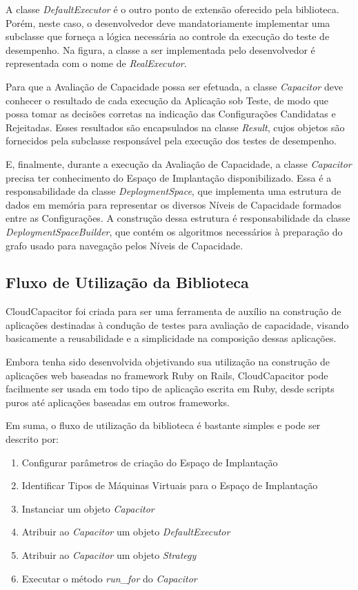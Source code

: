A classe \emph{DefaultExecutor} é o outro ponto de extensão oferecido pela biblioteca.
Porém, neste caso, o desenvolvedor deve mandatoriamente implementar uma subclasse
que forneça a lógica necessária ao controle da execução do teste de desempenho.
Na figura, a classe a ser implementada pelo desenvolvedor é representada com o 
nome de \emph{RealExecutor}.

Para que a Avaliação de Capacidade possa ser efetuada, a classe \emph{Capacitor}
deve conhecer o resultado de cada execução da Aplicação sob Teste, de modo que
possa tomar as decisões corretas na indicação das Configurações Candidatas e
Rejeitadas. Esses resultados são encapsulados na classe \emph{Result}, cujos 
objetos são fornecidos pela subclasse responsável pela execução dos testes de 
desempenho.

E, finalmente, durante a execução da Avaliação de Capacidade, a classe \emph{Capacitor} 
precisa ter conhecimento do Espaço de Implantação disponibilizado. Essa é a 
responsabilidade da classe \emph{DeploymentSpace}, que implementa uma estrutura 
de dados em memória para representar os diversos Níveis de Capacidade formados 
entre as Configurações. A construção dessa estrutura é responsabilidade da classe 
\emph{DeploymentSpaceBuilder}, que contém os algoritmos necessários à preparação 
do grafo usado para navegação pelos Níveis de Capacidade. 

\subsection{Fluxo de Utilização da Biblioteca}
\label{subsec:fluxo}
CloudCapacitor foi criada para ser uma ferramenta de auxílio na construção de 
aplicações destinadas à condução de testes para avaliação de capacidade,
visando basicamente a reusabilidade e a simplicidade na composição dessas 
aplicações.

Embora tenha sido desenvolvida objetivando sua utilização na construção de 
aplicações web baseadas no framework Ruby on Rails, CloudCapacitor pode facilmente
ser usada em todo tipo de aplicação escrita em Ruby, desde scripts puros até
aplicações baseadas em outros frameworks.

Em suma, o fluxo de utilização da biblioteca é bastante simples e pode ser 
descrito por:

\begin{enumerate}
  \item Configurar parâmetros de criação do Espaço de Implantação 
  \item Identificar Tipos de Máquinas Virtuais para o Espaço de Implantação
  \item Instanciar um objeto \emph{Capacitor}
  \item Atribuir ao \emph{Capacitor} um objeto \emph{DefaultExecutor}
  \item Atribuir ao \emph{Capacitor} um objeto \emph{Strategy}
  \item Executar o método \emph{run\_for} do \emph{Capacitor}
\end{enumerate}

